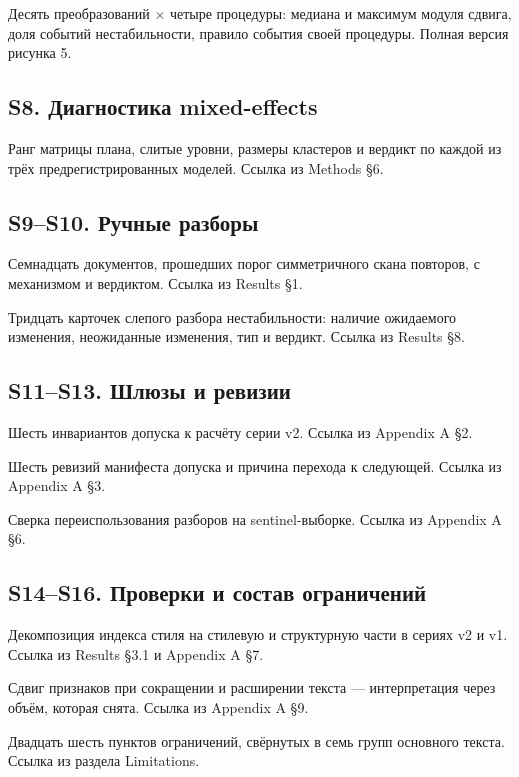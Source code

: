 \documentclass[11pt,a4paper]{article}
\renewcommand{\_}{\textunderscore\allowbreak}
\begin{document}
Десять преобразований $\times$ четыре процедуры: медиана и максимум модуля сдвига, доля
событий нестабильности, правило события своей процедуры. Полная версия рисунка 5.

\subsection{S8. Диагностика mixed-effects}



Ранг матрицы плана, слитые уровни, размеры кластеров и вердикт по каждой из трёх
предрегистрированных моделей. Ссылка из Methods §6.

\subsection{S9–S10. Ручные разборы}



Семнадцать документов, прошедших порог симметричного скана повторов, с механизмом и
вердиктом. Ссылка из Results §1.



Тридцать карточек слепого разбора нестабильности: наличие ожидаемого изменения,
неожиданные изменения, тип и вердикт. Ссылка из Results §8.

\subsection{S11–S13. Шлюзы и ревизии}



Шесть инвариантов допуска к расчёту серии v2. Ссылка из Appendix A §2.



Шесть ревизий манифеста допуска и причина перехода к следующей. Ссылка из
Appendix A §3.



Сверка переиспользования разборов на sentinel-выборке. Ссылка из Appendix A §6.

\subsection{S14–S16. Проверки и состав ограничений}



Декомпозиция индекса стиля на стилевую и структурную части в сериях v2 и v1. Ссылка
из Results §3.1 и Appendix A §7.



Сдвиг признаков при сокращении и расширении текста — интерпретация через объём,
которая снята. Ссылка из Appendix A §9.



Двадцать шесть пунктов ограничений, свёрнутых в семь групп основного текста.
Ссылка из раздела Limitations.
\end{document}
